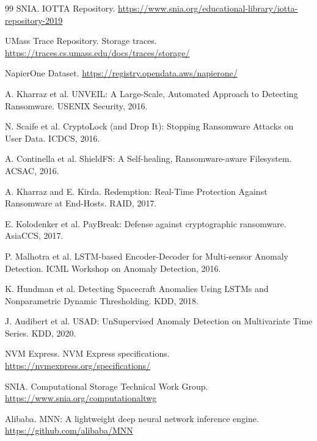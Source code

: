 \begin{thebibliography}{99}
SNIA.
IOTTA Repository.
\url{https://www.snia.org/educational-library/iotta-repository-2019}

UMass Trace Repository.
Storage traces.
\url{https://traces.cs.umass.edu/docs/traces/storage/}

NapierOne Dataset.
\url{https://registry.opendata.aws/napierone/}

A. Kharraz et al.
UNVEIL: A Large-Scale, Automated Approach to Detecting Ransomware.
USENIX Security, 2016.

N. Scaife et al.
CryptoLock (and Drop It): Stopping Ransomware Attacks on User Data.
ICDCS, 2016.

A. Continella et al.
ShieldFS: A Self-healing, Ransomware-aware Filesystem.
ACSAC, 2016.

A. Kharraz and E. Kirda.
Redemption: Real-Time Protection Against Ransomware at End-Hosts.
RAID, 2017.

E. Kolodenker et al.
PayBreak: Defense against cryptographic ransomware.
AsiaCCS, 2017.

P. Malhotra et al.
LSTM-based Encoder-Decoder for Multi-sensor Anomaly Detection.
ICML Workshop on Anomaly Detection, 2016.

K. Hundman et al.
Detecting Spacecraft Anomalies Using LSTMs and Nonparametric Dynamic Thresholding.
KDD, 2018.

J. Audibert et al.
USAD: UnSupervised Anomaly Detection on Multivariate Time Series.
KDD, 2020.

NVM Express.
NVM Express specifications.
\url{https://nvmexpress.org/specifications/}

SNIA.
Computational Storage Technical Work Group.
\url{https://www.snia.org/computationaltwg}

Alibaba.
MNN: A lightweight deep neural network inference engine.
\url{https://github.com/alibaba/MNN}

\end{thebibliography}
